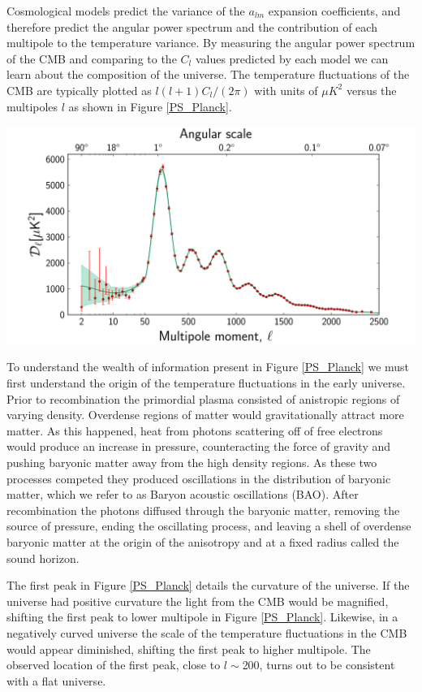 \documentclass[a4paper,12pt]{article}
\begin{document}
Cosmological models predict the variance of the $a_{lm}$ expansion coefficients, and therefore predict the angular power spectrum and the contribution of each multipole to the temperature variance.  By measuring the angular power spectrum of the CMB and comparing to the $C_l$ values predicted by each model we can learn about the composition of the universe.  The temperature fluctuations of the CMB are typically plotted as $l(l+1)C_l/(2\pi)$ with units of $\mu K^2$ versus the multipoles $l$ as shown in Figure \ref{PS_Planck}.

\begin{center} \label{PS_Planck}
\includegraphics[scale=0.4]{PS_Planck.png}
\end{center} 


To understand the wealth of information present in Figure \ref{PS_Planck} we must first understand the origin of the temperature fluctuations in the early universe.  Prior to recombination the primordial plasma consisted of anistropic regions of varying density. Overdense regions of matter would gravitationally attract more matter.  As this happened, heat from photons scattering off of free electrons would produce an increase in pressure, counteracting the force of gravity and pushing baryonic matter away from the high density regions.  As these two processes competed they produced oscillations in the distribution of baryonic matter, which we refer to as Baryon acoustic oscillations (BAO).  After recombination the photons diffused through the baryonic matter, removing the source of pressure, ending the oscillating process, and leaving a shell of overdense baryonic matter at the origin of the anisotropy and at a fixed radius called the sound horizon.

The first peak in Figure \ref{PS_Planck} details the curvature of the universe. If the universe had positive curvature the light from the CMB would be magnified, shifting the first peak to lower multipole in Figure \ref{PS_Planck}.  Likewise, in a negatively curved universe the scale of the temperature fluctuations in the CMB would appear diminished, shifting the first peak to higher multipole.  The observed location of the first peak, close to $l\sim$200, turns out to be consistent with a flat universe.  
\end{document}
